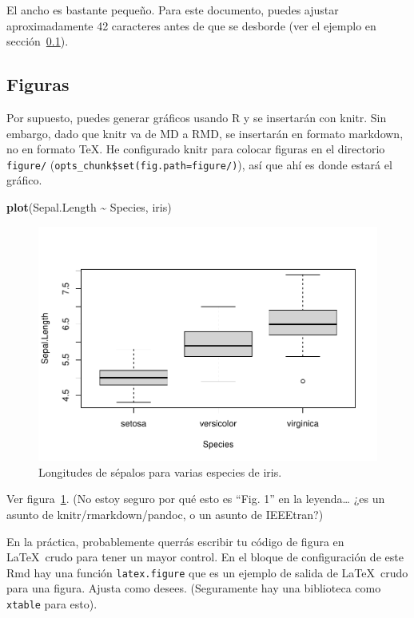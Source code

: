 \documentclass[a4paper,conference]{IEEEtran}
\newenvironment{Shaded}{\begin{snugshade}}{\end{snugshade}}
\newcommand{\FunctionTok}[1]{\textcolor[rgb]{0.13,0.29,0.53}{\textbf{#1}}}
\newcommand{\NormalTok}[1]{#1}
\newcommand{\SpecialCharTok}[1]{\textcolor[rgb]{0.81,0.36,0.00}{\textbf{#1}}}
\begin{document}
El ancho es bastante pequeño. Para este documento, puedes ajustar
aproximadamente 42 caracteres antes de que se desborde (ver el ejemplo
en sección~\ref{sec:figuras}).

\subsection{Figuras}\label{sec:figuras}

Por supuesto, puedes generar gráficos usando R y se insertarán con
knitr. Sin embargo, dado que knitr va de MD a RMD, se insertarán en
formato markdown, no en formato TeX. He configurado knitr para colocar
figuras en el directorio \texttt{figure/}
(\texttt{opts\_chunk\$set(fig.path=\textquotesingle{}figure/\textquotesingle{})}),
así que ahí es donde estará el gráfico.

\begin{Shaded}
\begin{Highlighting}[]
\FunctionTok{plot}\NormalTok{(Sepal.Length }\SpecialCharTok{\textasciitilde{}}\NormalTok{ Species, iris)}
\end{Highlighting}
\end{Shaded}

\begin{figure}
\centering
\includegraphics{figure/iris.plot-1.pdf}
\caption{Longitudes de sépalos para varias especies de
iris.\label{fig:iris}}
\end{figure}

Ver figura~\ref{fig:iris}. (No estoy seguro por qué esto es ``Fig. 1''
en la leyenda\ldots{} ¿es un asunto de knitr/rmarkdown/pandoc, o un
asunto de IEEEtran?)

En la práctica, probablemente querrás escribir tu código de figura en
\LaTeX~crudo para tener un mayor control. En el bloque de configuración
de este Rmd hay una función \texttt{latex.figure} que es un ejemplo de
salida de \LaTeX~crudo para una figura. Ajusta como desees. (Seguramente
hay una biblioteca como \texttt{xtable} para esto).
\end{document}
